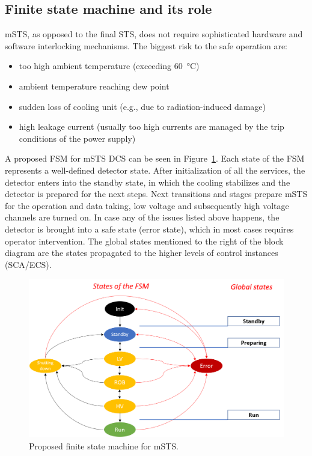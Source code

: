 \subsection{Finite state machine and its role}
\gls{mSTS}, as opposed to the final \gls{STS}, does not require sophisticated hardware and software interlocking mechanisms. The biggest risk to the safe operation are:
\begin{itemize}
    \item too high ambient temperature (exceeding \SI{60}{\degreeCelsius})
    \item ambient temperature reaching dew point 
    \item sudden loss of cooling unit (e.g., due to radiation-induced damage)
    \item high leakage current (usually too high currents are managed by the trip conditions of the power supply)
\end{itemize}
A proposed \gls{FSM} for \gls{mSTS} \gls{DCS} can be seen in Figure~\ref{fig_FSM}. Each state of the \gls{FSM} represents a well-defined detector state. After initialization of all the services, the detector enters into the standby state, in which the cooling stabilizes and the detector is prepared for the next steps. Next transitions and stages prepare \gls{mSTS} for the operation and data taking, low voltage and subsequently high voltage channels are turned on. In case any of the issues listed above happens, the detector is brought into a safe state (error state), which in most cases requires operator intervention. The global states mentioned to the right of the block diagram are the states propagated to the higher levels of control instances (\gls{SCA}/\gls{ECS}).
\begin{figure}[h!]
\centering
\includegraphics[width=1\columnwidth]{Chapter6/DCS/images/FSM.png}
\caption{Proposed finite state machine for \gls{mSTS}. }
\label{fig_FSM}
\end{figure}

